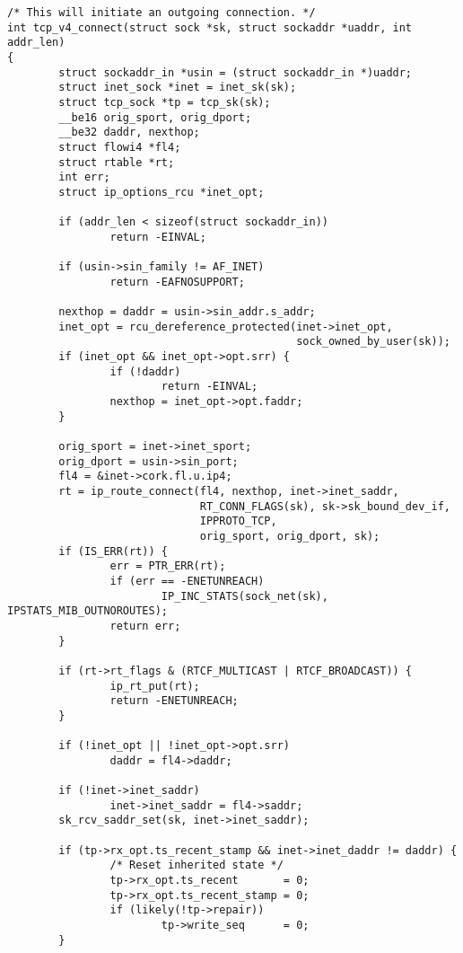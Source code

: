 \documentclass[11pt, a4paper,oneside]{book}
\theoremstyle{ocrenumbox}
\theoremstyle{purplenumbox}
\theoremstyle{blackbox}
\begin{document}
\begin{verbatim}
/* This will initiate an outgoing connection. */
int tcp_v4_connect(struct sock *sk, struct sockaddr *uaddr, int addr_len)
{
        struct sockaddr_in *usin = (struct sockaddr_in *)uaddr;
        struct inet_sock *inet = inet_sk(sk);
        struct tcp_sock *tp = tcp_sk(sk);
        __be16 orig_sport, orig_dport;
        __be32 daddr, nexthop;
        struct flowi4 *fl4;
        struct rtable *rt;
        int err;
        struct ip_options_rcu *inet_opt;

        if (addr_len < sizeof(struct sockaddr_in))
                return -EINVAL;

        if (usin->sin_family != AF_INET)
                return -EAFNOSUPPORT;

        nexthop = daddr = usin->sin_addr.s_addr;
        inet_opt = rcu_dereference_protected(inet->inet_opt,
                                             sock_owned_by_user(sk));
        if (inet_opt && inet_opt->opt.srr) {
                if (!daddr)
                        return -EINVAL;
                nexthop = inet_opt->opt.faddr;
        }

        orig_sport = inet->inet_sport;
        orig_dport = usin->sin_port;
        fl4 = &inet->cork.fl.u.ip4;
        rt = ip_route_connect(fl4, nexthop, inet->inet_saddr,
                              RT_CONN_FLAGS(sk), sk->sk_bound_dev_if,
                              IPPROTO_TCP,
                              orig_sport, orig_dport, sk);
        if (IS_ERR(rt)) {
                err = PTR_ERR(rt);
                if (err == -ENETUNREACH)
                        IP_INC_STATS(sock_net(sk), IPSTATS_MIB_OUTNOROUTES);
                return err;
        }

        if (rt->rt_flags & (RTCF_MULTICAST | RTCF_BROADCAST)) {
                ip_rt_put(rt);
                return -ENETUNREACH;
        }

        if (!inet_opt || !inet_opt->opt.srr)
                daddr = fl4->daddr;

        if (!inet->inet_saddr)
                inet->inet_saddr = fl4->saddr;
        sk_rcv_saddr_set(sk, inet->inet_saddr);

        if (tp->rx_opt.ts_recent_stamp && inet->inet_daddr != daddr) {
                /* Reset inherited state */
                tp->rx_opt.ts_recent       = 0;
                tp->rx_opt.ts_recent_stamp = 0;
                if (likely(!tp->repair))
                        tp->write_seq      = 0;
        }


\end{verbatim}
\end{document}
